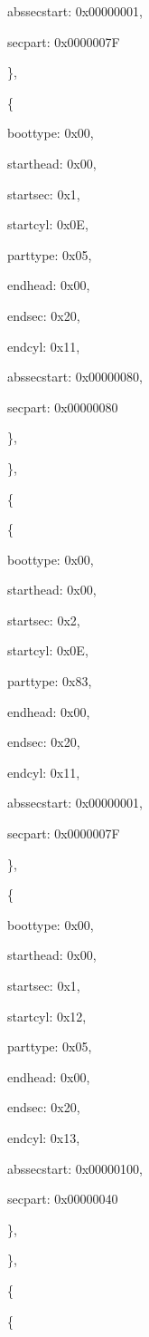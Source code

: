 \documentclass[11pt]{article}
\begin{document}
			abssecstart: 0x00000001,
			
			secpart: 0x0000007F
			
		\},
		
		\{
		
			boottype: 0x00,
			
			starthead: 0x00,
			
			startsec: 0x1,
			
			startcyl: 0x0E,
			
			parttype: 0x05,
			
			endhead: 0x00,
			
			endsec: 0x20,
			
			endcyl: 0x11,
			
			abssecstart: 0x00000080,
			
			secpart: 0x00000080
			
		\},
		
	\},
	
	\{
	
		\{
		
			boottype: 0x00,
			
			starthead: 0x00,
			
			startsec: 0x2,
			
			startcyl: 0x0E,
			
			parttype: 0x83,
			
			endhead: 0x00,
			
			endsec: 0x20,
			
			endcyl: 0x11,
			
			abssecstart: 0x00000001,
			
			secpart: 0x0000007F
			
		\},
		
		\{
		
			boottype: 0x00,
			
			starthead: 0x00,
			
			startsec: 0x1,
			
			startcyl: 0x12,
			
			parttype: 0x05,
			
			endhead: 0x00,
			
			endsec: 0x20,
			
			endcyl: 0x13,
			
			abssecstart: 0x00000100,
			
			secpart: 0x00000040
			
		\},
		
	\},
	
	\{
	
		\{
		
\end{document}
